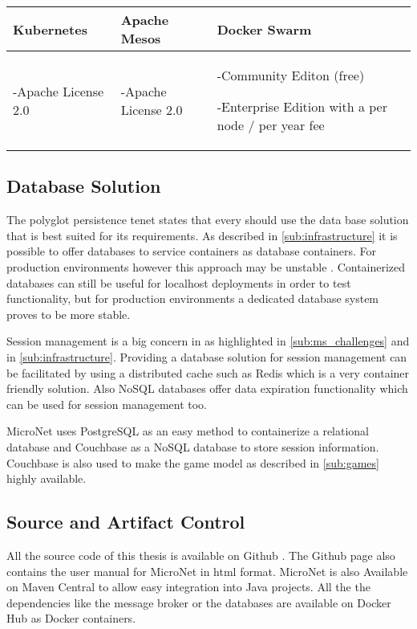 \begin{center}
  \begin{tabular}{ | p{4.5cm} | p{4.5cm} | p{4.5cm} | }
    \hline
    \textbf{Kubernetes}&\textbf{Apache Mesos}&\textbf{Docker Swarm}\\\hline
    -Apache License 2.0 & 
    
    -Apache License 2.0 & 
    
    -Community Editon (free) 
    
    -Enterprise Edition with a per node / per year fee\\
    \hline
  \end{tabular}
\end{center}

\subsection{Database Solution}
\label{sub:database_solutions}

The polyglot persistence tenet states that every \ms{} should use the data base
solution that is best suited for its requirements. As described in
\autoref{sub:infrastructure} it is possible to offer databases to service
containers as database containers. For production environments however this
approach may be unstable \cite{cazorla2017db_containers}. Containerized
databases can still be useful for localhost deployments in order to test
functionality, but for production environments a dedicated database system
proves to be more stable.

Session management is a big concern in \ogs{} as highlighted in
\autoref{sub:ms_challenges} and in \autoref{sub:infrastructure}. Providing a
database solution for session management can be facilitated by using a
distributed cache such as Redis which is a very container friendly solution.
Also NoSQL databases offer data expiration functionality which can be used
for session management too.

MicroNet uses PostgreSQL as an easy method to containerize a relational database
and Couchbase as a NoSQL database to store session information. Couchbase is also
used to make the game model as described in \autoref{sub:games} highly
available.

\subsection{Source and Artifact Control}

All the source code of this thesis is available on Github
\cite{micronet2017doku}. The Github page also contains the user manual for
MicroNet in \gls{html} format. MicroNet is also Available on Maven Central to
allow easy integration into Java projects. All the the dependencies like the
message broker or the databases are available on Docker Hub as Docker
containers.

